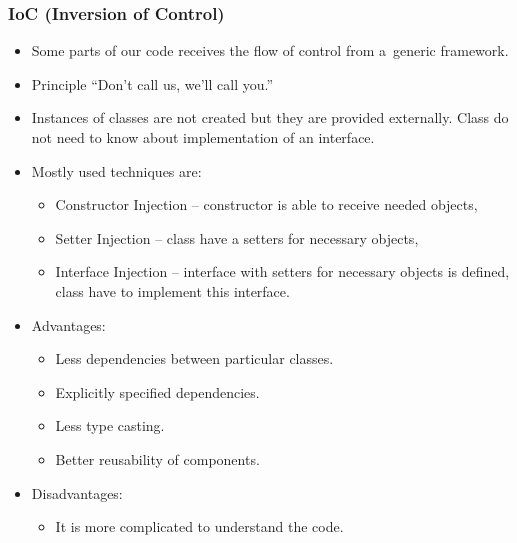 \documentclass[10pt,xcolor=pdflatex, table]{beamer}
\begin{document}
\begin{frame}\frametitle{IoC (Inversion of Control)}
  \begin{itemize}
    \item Some parts of our code receives the flow of control from a~generic framework.
    \item Principle ``Don't call us, we'll call you.''
    \item Instances of classes are not created but they are provided externally. Class do not need to know about implementation of an interface.
    \item Mostly used techniques are:
      \begin{itemize}
        \item Constructor Injection -- constructor is able to receive needed objects,
        \item Setter Injection -- class have a setters for necessary objects,
        \item Interface Injection -- interface with setters for necessary objects is defined, class have to implement this interface.
      \end{itemize}
    \item Advantages:
      \begin{itemize}
        \item Less dependencies between particular classes.
        \item Explicitly specified dependencies.
        \item Less type casting.
        \item Better reusability of components.
      \end{itemize}
    \item Disadvantages:
      \begin{itemize}
        \item It is more complicated to understand the code.
      \end{itemize}
  \end{itemize}
\end{frame}
\end{document}
